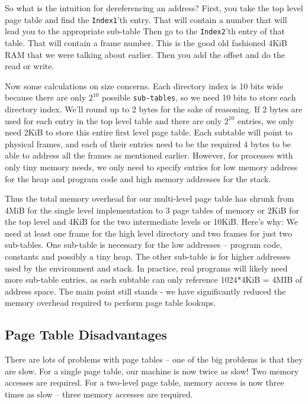 So what is the intuition for dereferencing an address?
First, you take the top level page table and find the \texttt{Index1}'th entry.
That will contain a number that will lead you to the appropriate sub-table
Then go to the \texttt{Index2}'th entry of that table.
That will contain a frame number.
This is the good old fashioned 4KiB RAM that we were talking about earlier.
Then you add the offset and do the read or write.

Now some calculations on size concerns.
Each directory index is 10 bits wide because there are only $2^{10}$ possible \texttt{sub-tables}, so we need 10 bits to store each directory index.
We'll round up to 2 bytes for the sake of reasoning.
If 2 bytes are used for each entry in the top level table and there are only $2^{10}$ entries, we only need 2KiB to store this entire first level page table.
Each subtable will point to physical frames, and each of their entries need to be the required 4 bytes to be able to address all the frames as mentioned earlier.
However, for processes with only tiny memory needs, we only need to specify entries for low memory address for the heap and program code and high memory addresses for the stack.

Thus the total memory overhead for our multi-level page table has shrunk from 4MiB for the single level implementation to 3 page tables of memory or 2KiB for the top level and 4KiB for the two intermediate levels or 10KiB.
Here's why: We need at least one frame for the high level directory and two frames for just two sub-tables.
One sub-table is necessary for the low addresses -- program code, constants and possibly a tiny heap.
The other sub-table is for higher addresses used by the environment and stack.
In practice, real programs will likely need more sub-table entries, as each subtable can only reference 1024*4KiB = 4MIB of address space.
The main point still stands - we have significantly reduced the memory overhead required to perform page table lookups.

\subsection{Page Table Disadvantages}

There are lots of problems with page tables -- one of the big problems is that they are slow.
For a single page table, our machine is now twice as slow!
Two memory accesses are required.
For a two-level page table, memory access is now three times as slow -- three memory accesses are required.

